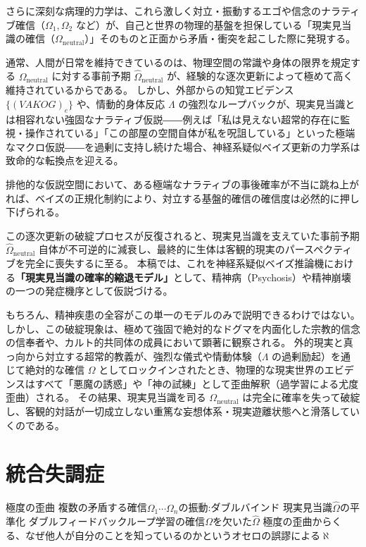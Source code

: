 さらに深刻な病理的力学は、これら激しく対立・振動するエゴや信念のナラティブ確信（$\Omega_1, \Omega_2$ など）が、自己と世界の物理的基盤を担保している「現実見当識の確信（$\Omega_{\mathrm{neutral}}$）」そのものと正面から矛盾・衝突を起こした際に発現する。

通常、人間が日常を維持できているのは、物理空間の常識や身体の限界を規定する $\Omega_{\mathrm{neutral}}$ に対する事前予期 $\hat{\Omega}_{\mathrm{neutral}}$ が、経験的な逐次更新によって極めて高く維持されているからである。
しかし、外部からの知覚エビデンス $\{(VAKOG)_e\}$ や、情動的身体反応 $\Lambda$ の強烈なループバックが、現実見当識とは相容れない強固なナラティブ仮説――例えば「私は見えない超常的存在に監視・操作されている」「この部屋の空間自体が私を呪詛している」といった極端なマクロ仮説――を過剰に支持し続けた場合、神経系疑似ベイズ更新の力学系は致命的な転換点を迎える。

排他的な仮説空間において、ある極端なナラティブの事後確率が不当に跳ね上がれば、ベイズの正規化制約により、対立する基盤的確信の確信度は必然的に押し下げられる。

この逐次更新の破綻プロセスが反復されると、現実見当識を支えていた事前予期 $\hat{\Omega}_{\mathrm{neutral}}$ 自体が不可逆的に減衰し、最終的に生体は客観的現実のパースペクティブを完全に喪失するに至る。
本稿では、これを神経系疑似ベイズ推論機における\textbf{「現実見当識の確率的縮退モデル」}として、精神病（Psychosis）や精神崩壊の一つの発症機序として仮説づける。

もちろん、精神疾患の全容がこの単一のモデルのみで説明できるわけではない。
しかし、この破綻現象は、極めて強固で絶対的なドグマを内面化した宗教的信念の信奉者や、カルト的共同体の成員において顕著に観察される。
外的現実と真っ向から対立する超常的教義が、強烈な儀式や情動体験（$\Lambda$ の過剰励起）を通じて絶対的な確信 $\Omega$ としてロックインされたとき、物理的な現実世界のエビデンスはすべて「悪魔の誘惑」や「神の試練」として歪曲解釈（過学習による尤度歪曲）される。
その結果、現実見当識を司る $\Omega_{\mathrm{neutral}}$ は完全に確率を失って破綻し、客観的対話が一切成立しない重篤な妄想体系・現実遊離状態へと滑落していくのである。

\section{統合失調症}
極度の歪曲
複数の矛盾する確信$\Omega_1 \cdots \Omega_n$の振動:ダブルバインド
現実見当識$\hat{\Omega}$の平準化
ダブルフィードバックループ学習の確信$\Omega$を欠いた$\hat{\Omega}$
極度の歪曲からくる、なぜ他人が自分のことを知っているのかというオセロの誤謬による$\aleph$

